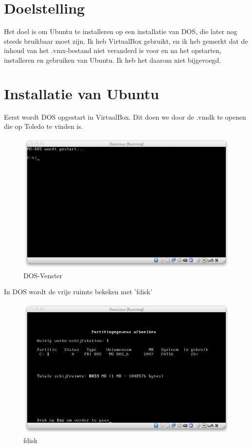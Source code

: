 \documentclass[11pt, a4paper]{article}
\begin{document}
\newpage




\section{Doelstelling}
Het doel is om Ubuntu te installeren op een installatie van DOS, die later nog steeds bruikbaar moet zijn. Ik heb VirtualBox gebruikt, en ik heb gemerkt dat de inhoud van het .vmx-bestand niet veranderd is voor en na het opstarten, installeren en gebruiken van Ubuntu. Ik heb het daarom niet bijgevoegd.




\section{Installatie van Ubuntu}

Eerst wordt DOS opgestart in VirtualBox. Dit doen we door de .vmdk te openen die op Toledo te vinden is. 

\begin{figure}[H]
	\centering
	\includegraphics[width=\textwidth]{./IMG/A}
	\caption{DOS-Venster}
\end{figure}

In DOS wordt de vrije ruimte bekeken met 'fdisk'

\begin{figure}[H]
	\centering
	\includegraphics[width=\textwidth]{./IMG/B}
	\caption{fdisk}
\end{figure}
\end{document}
